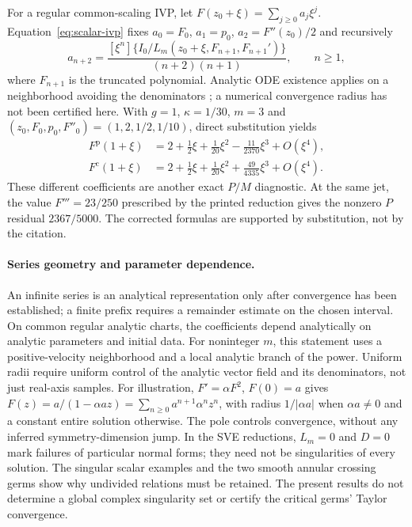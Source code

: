 \documentclass[12pt,a4paper,oneside]{report}
\numberwithin{equation}{chapter}
\theoremstyle{remark}\newtheorem{remark}[theorem]{Remark}
\begin{document}
For a regular common-scaling IVP, let
$F(z_0+\xi)=\sum_{j\ge0}a_j\xi^j$. Equation~\eqref{eq:scalar-ivp}
fixes $a_0=F_0$, $a_1=p_0$, $a_2=F''(z_0)/2$ and recursively
\begin{equation}\label{eq:taylor}
 a_{n+2}=\frac{[\xi^n]\{I_0/L_m(z_0+\xi,F_{n+1},F_{n+1}')\}}
 {(n+2)(n+1)},\qquad n\ge1,
\end{equation}
where $F_{n+1}$ is the truncated polynomial.
Analytic ODE existence applies on a neighborhood avoiding the denominators
\cite[Theorem~4.1]{teschl2012}; a numerical convergence radius has not been
certified here. With $g=1$, $\kappa=1/30$, $m=3$ and
$(z_0,F_0,p_0,F''_0)=(1,2,1/2,1/10)$, direct substitution yields
\begin{equation}\label{eq:taylor-witness}
 \begin{aligned}
 F^{\mathrm p}(1+\xi)&=2+\tfrac12\xi+\tfrac1{20}\xi^2
                         -\tfrac{11}{2370}\xi^3+O(\xi^4),\\
 F^{\mathrm c}(1+\xi)&=2+\tfrac12\xi+\tfrac1{20}\xi^2
                         +\tfrac{49}{4335}\xi^3+O(\xi^4).
 \end{aligned}
\end{equation}
These different coefficients are another exact $P/M$ diagnostic. At the same
jet, the value $F'''=23/250$ prescribed by the printed reduction
\cite[Eq.~(24)]{ap} gives the nonzero $P$ residual $2367/5000$.
The corrected formulas are supported by substitution, not by the citation.

\paragraph{Series geometry and parameter dependence.}
An infinite series is an analytical representation only after convergence
has been established; a finite prefix requires a remainder estimate on the
chosen interval. On common regular analytic charts, the coefficients depend
analytically on analytic parameters and initial data. For noninteger $m$,
this statement uses a positive-velocity neighborhood and a local analytic
branch of the power. Uniform radii require uniform control of the analytic
vector field and its denominators, not just real-axis samples.
For illustration, $F'=\alpha F^2$, $F(0)=a$ gives
$F(z)=a/(1-\alpha az)=\sum_{n\ge0}a^{n+1}\alpha^nz^n$, with radius
$1/|\alpha a|$ when $\alpha a\ne0$ and a constant entire solution otherwise.
The pole controls convergence, without any inferred symmetry-dimension jump.
In the SVE reductions, $L_m=0$ and $D=0$ mark failures of particular normal
forms; they need not be singularities of every solution. The singular scalar
examples and the two smooth annular crossing germs show why undivided
relations must be retained. The present results do not determine a global
complex singularity set or certify the critical germs' Taylor convergence.
\end{document}

